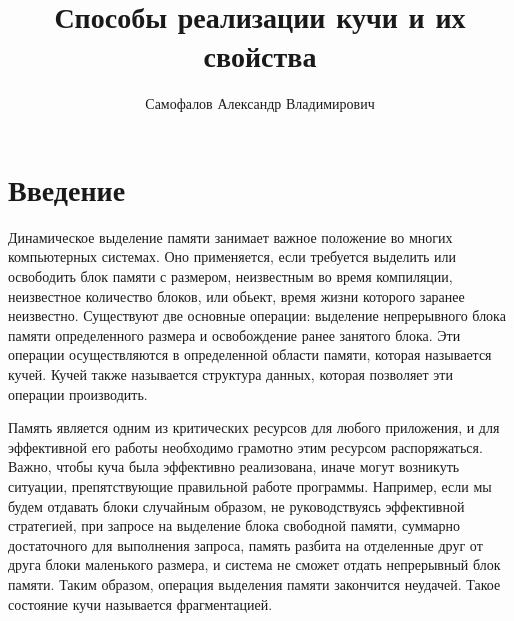 
%	

\title{Способы реализации кучи и их свойства}
%
\author{Самофалов Александр Владимирович}
%
%
%

\maketitle              %

\begin{abstract}

\end{abstract}
%


\section*{Введение}

Динамическое выделение памяти занимает важное положение во многих компьютерных системах. Оно применяется,
если требуется выделить или освободить блок памяти с размером, неизвестным во время компиляции, неизвестное количество блоков, или обьект, время жизни которого заранее неизвестно. 
Существуют две основные операции: выделение непрерывного блока памяти определенного размера и освобождение ранее занятого блока. Эти операции осуществляются в определенной области памяти, которая называется кучей. Кучей также называется структура данных, которая позволяет эти операции производить.

Память является одним из критических ресурсов для любого приложения, и для эффективной его работы необходимо грамотно этим ресурсом распоряжаться. Важно, чтобы куча была эффективно реализована, иначе могут возникуть ситуации, препятствующие правильной работе программы. Например, если мы будем отдавать блоки случайным образом, не руководствуясь эффективной стратегией,
при запросе на выделение блока свободной памяти, суммарно достаточного для выполнения запроса, память разбита на отделенные друг от друга блоки маленького размера, и система не 
сможет отдать непрерывный блок памяти. Таким образом, операция выделения памяти закончится неудачей. 
Такое состояние кучи называется фрагментацией.

